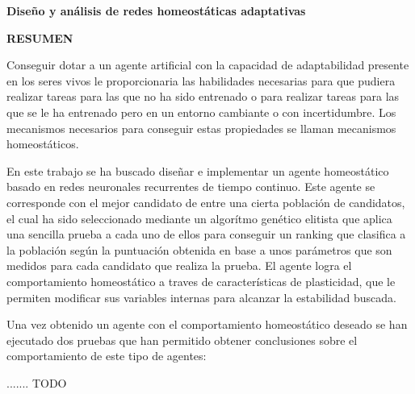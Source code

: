 \begin{center}
{\Large \bfseries Diseño y análisis de redes homeostáticas adaptativas}

\vspace{1cm}
{\Large \bfseries RESUMEN}

\vspace{2.5cm}
\end{center}

Conseguir dotar a un agente artificial con la capacidad de adaptabilidad presente en los seres vivos le proporcionaria las habilidades necesarias para que pudiera realizar tareas para las que no ha sido entrenado o
para realizar tareas para las que se le ha entrenado pero en un entorno cambiante o con incertidumbre. Los mecanismos necesarios para conseguir estas propiedades se llaman mecanismos homeostáticos.

En este trabajo se ha buscado diseñar e implementar un agente homeostático basado en redes neuronales recurrentes de tiempo continuo. Este agente se corresponde con el mejor candidato de entre una cierta población de candidatos,
el cual ha sido seleccionado mediante un algorítmo genético elitista que aplica una sencilla prueba a cada uno de ellos para conseguir un ranking que clasifica a la población según la puntuación obtenida en base a unos parámetros
que son medidos para cada candidato que realiza la prueba. El agente logra el comportamiento homeostático a traves de características de plasticidad, que le permiten modificar sus variables internas para alcanzar la estabilidad
buscada.

Una vez obtenido un agente con el comportamiento homeostático deseado se han ejecutado dos pruebas que han permitido obtener conclusiones sobre el comportamiento de este tipo de agentes:

....... TODO
